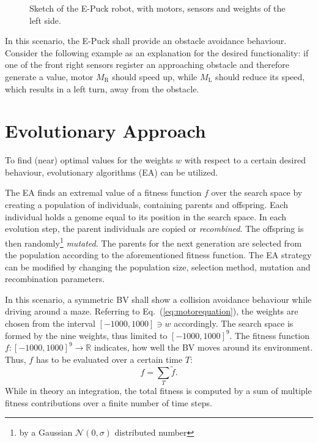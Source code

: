 \documentclass[a4paper]{jacow}
\begin{document}
\begin{figure}[hbt]
	\centering
	
	\caption{Sketch of the E-Puck robot, with motors, sensors and weights of the left side.}
	\label{fig:epuck}
\end{figure}

In this scenario, the E-Puck shall provide an obstacle avoidance behaviour. Consider the following example as an explanation for the desired functionality: if one of the front right sensors register an approaching obstacle and therefore generate a value, motor $M_\mathrm{R}$ should speed up, while $M_\mathrm{L}$ should reduce its speed, which results in a left turn, away from the obstacle.

\section{Evolutionary Approach}

To find (near) optimal values for the weights $w$ with respect to a certain desired behaviour, evolutionary algorithms (EA) can be utilized.

The EA finds an extremal value of a fitness function $f$ over the search space by creating a population of individuals, containing parents and offspring. Each individual holds a genome equal to its position in the search space. In each evolution step, the parent individuals are copied or \emph{recombined}. The offspring is then randomly\footnote{by a Gaussian $\mathcal{N}(0,\sigma)$ distributed number} \emph{mutated}. The parents for the next generation are selected from the population according to the aforementioned fitness function. The EA strategy can be modified by changing the population size, selection method, mutation and recombination parameters.

In this scenario, a symmetric BV shall show a collision avoidance behaviour while driving around a maze. Referring to Eq.~(\ref{eq:motorequation}), the weights are chosen from the interval $[-1000,1000]\ni w$ accordingly. The search space is formed by the nine weights, thus limited to $[-1000,1000]^9$. The fitness function \mbox{$f:[-1000,1000]^9\to \mathbb{R}$} indicates, how well the BV moves around its environment. Thus, $f$ has to be evaluated over a certain time $T$:
\begin{equation}
	f = \sum\limits_T \tilde{f}.
\end{equation}
While in theory an integration, the total fitness is computed by a sum of multiple fitness contributions over a finite number of time steps. 
\end{document}
